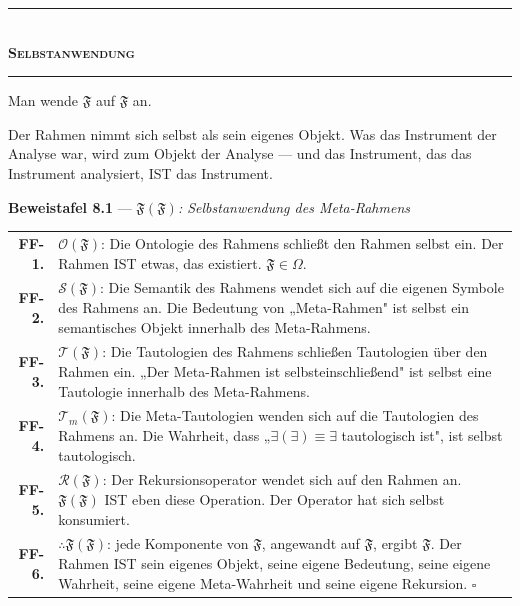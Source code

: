 \documentclass[10pt, openany, oneside]{book}
\renewcommand{\normalsize}{\fontsize{10}{13}\selectfont}
\renewcommand{\footnotesize}{\fontsize{8.5}{11}\selectfont}
\begin{document}
\begin{center}
    \rule{0.3\textwidth}{0.4pt}\\[0.5em]
    {\normalsize\bfseries\scshape Selbstanwendung}\\[0.3em]
    \rule{0.3\textwidth}{0.4pt}
\end{center}

\vspace{1em}

\noindent Man wende $\mathfrak{F}$ auf $\mathfrak{F}$ an.

Der Rahmen nimmt sich selbst als sein eigenes Objekt. Was das Instrument der Analyse war, wird zum Objekt der Analyse --- und das Instrument, das das Instrument analysiert, IST das Instrument.

\vspace{0.5em}

\textbf{Beweistafel 8.1} --- \textit{$\mathfrak{F}(\mathfrak{F})$: Selbstanwendung des Meta-Rahmens}

\vspace{0.5em}

{\footnotesize
\noindent\begin{tabular}{r p{}}
\textbf{FF-1.} & $\mathcal{O}(\mathfrak{F})$: Die Ontologie des Rahmens schließt den Rahmen selbst ein. Der Rahmen IST etwas, das existiert. $\mathfrak{F} \in \Omega$. \\[0.3em]
\textbf{FF-2.} & $\mathcal{S}(\mathfrak{F})$: Die Semantik des Rahmens wendet sich auf die eigenen Symbole des Rahmens an. Die Bedeutung von „Meta-Rahmen" ist selbst ein semantisches Objekt innerhalb des Meta-Rahmens. \\[0.3em]
\textbf{FF-3.} & $\mathcal{T}(\mathfrak{F})$: Die Tautologien des Rahmens schließen Tautologien über den Rahmen ein. „Der Meta-Rahmen ist selbsteinschließend" ist selbst eine Tautologie innerhalb des Meta-Rahmens. \\[0.3em]
\textbf{FF-4.} & $\mathcal{T}_m(\mathfrak{F})$: Die Meta-Tautologien wenden sich auf die Tautologien des Rahmens an. Die Wahrheit, dass „$\exists(\exists) \equiv \exists$ tautologisch ist", ist selbst tautologisch. \\[0.3em]
\textbf{FF-5.} & $\mathcal{R}(\mathfrak{F})$: Der Rekursionsoperator wendet sich auf den Rahmen an. $\mathfrak{F}(\mathfrak{F})$ IST eben diese Operation. Der Operator hat sich selbst konsumiert. \\[0.3em]
\textbf{FF-6.} & $\therefore \mathfrak{F}(\mathfrak{F})$: jede Komponente von $\mathfrak{F}$, angewandt auf $\mathfrak{F}$, ergibt $\mathfrak{F}$. Der Rahmen IST sein eigenes Objekt, seine eigene Bedeutung, seine eigene Wahrheit, seine eigene Meta-Wahrheit und seine eigene Rekursion. $\square$ \\[0.3em]
\end{tabular}
}
\end{document}
